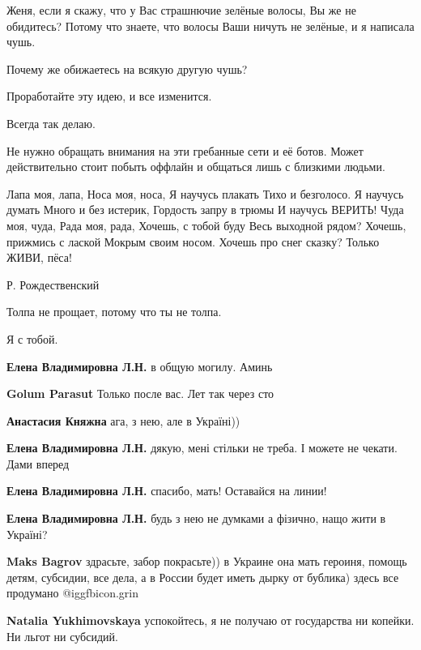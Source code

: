 \begin{itemize}
Женя, если я скажу, что у Вас страшнючие зелёные волосы, Вы же не обидитесь?
Потому что знаете, что волосы Ваши ничуть не зелёные, и я написала чушь.

Почему же обижаетесь на всякую другую чушь?

Проработайте эту идею, и все изменится.

Всегда так делаю.



Не нужно обращать внимания на эти гребанные сети и её ботов. Может
действительно стоит побыть оффлайн и общаться лишь с близкими людьми.


\obeycr
Лапа моя, лапа,
Носа моя, носа,
Я научусь плакать
Тихо и безголосо.
Я научусь думать
Много и без истерик,
Гордость запру в трюмы
И научусь ВЕРИТЬ!
Чуда моя, чуда,
Рада моя, рада,
Хочешь, с тобой буду
Весь выходной рядом?
Хочешь, прижмись с лаской
Мокрым своим носом.
Хочешь про снег сказку?
Только ЖИВИ, пёса!
\restorecr

Р. Рождественский

Толпа не прощает, потому что ты не толпа.

Я с тобой.

\begin{itemize} %
\textbf{Елена Владимировна Л.Н.} в общую могилу. Аминь

\textbf{Golum Parasut} Только после вас. Лет так через сто

\textbf{Анастасия Княжна} ага, з нею, але в Україні))

\textbf{Елена Владимировна Л.Н.} дякую, мені стільки не треба. І можете не чекати. Дами вперед

\textbf{Елена Владимировна Л.Н.} спасибо, мать! Оставайся на линии!

\textbf{Елена Владимировна Л.Н.} будь з нею не думками а фізично, нащо жити в Україні?

\textbf{Maks Bagrov} здрасьте, забор покрасьте)) в Украине она мать героиня, помощь детям, субсидии, все дела, а в России будет иметь дырку от бублика) здесь все продумано @igg{fbicon.grin} 

\textbf{Natalia Yukhimovskaya} успокойтесь, я не получаю от государства ни копейки. Ни льгот ни субсидий.


\end{itemize}
\end{itemize}
